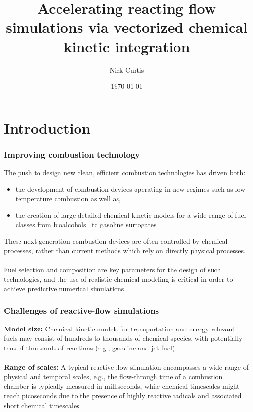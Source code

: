 \documentclass{beamer}
\title{Accelerating reacting flow simulations via vectorized chemical kinetic integration}
\author{Nick Curtis}
\institute{University of Connecticut}
\date{\today}
\newenvironment{background}{%
\usebackgroundtemplate{%
\rule{0pt}{\paperheight}%
\hspace*{\paperwidth}%
\makebox[0pt][r]{\texttt{[image: logo]}}%
}}{}
\def\parend/{\\~\\}
\begin{document}
\begin{background}
\maketitle
\end{background}

\begin{background}
\section{Introduction}
\end{background}

\begin{frame}
\frametitle{Improving combustion technology}
The push to design new clean, efficient combustion technologies has driven both:
\begin{itemize}
 \item the development of combustion devices operating in new regimes such as low-temperature combustion as well as,
 \item the creation of large detailed chemical kinetic models for a wide range of fuel classes from bioalcohols~ to gasoline surrogates.
\end{itemize}
These next generation combustion devices are often controlled by chemical processes, rather than current methods which rely on directly physical processes.\parend/
Fuel selection and composition are key parameters for the design of such technologies, and the use of realistic chemical modeling is critical in order to achieve predictive numerical simulations.
\end{frame}

\begin{frame}
 \frametitle{Challenges of reactive-flow simulations}
 \textbf{Model size:} Chemical kinetic models for transportation and energy relevant fuels may consist of hundreds to thousands of chemical species, with potentially tens of thousands of reactions (e.g., gasoline  and jet fuel)\parend/
 \textbf{Range of scales:} A typical reactive-flow simulation encompasses a wide range of physical and temporal scales, e.g., the flow-through time of a combustion chamber is typically measured in milliseconds, while chemical timescales might reach picoseconds due to the presence of highly reactive radicals and associated short chemical timescales.\parend/
\end{frame}
\end{document}
